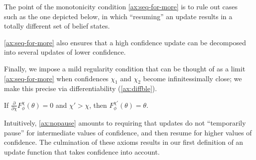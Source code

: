 The point of the monotonicity condition \cref{ax:seq-for-more} is to rule out cases such 
as the one depicted below, in which ``resuming'' an update
results in a totally different set of belief states.
\begin{center}
\end{center}
\cref{ax:seq-for-more} also ensures
that a high confidence update can be decomposed into
several updates of lower confidence. 


Finally, we impose a mild regularity condition
that can be thought of as
a limit \cref{ax:seq-for-more}
when confidences $\chi_1$ and $\chi_2$ become infinitessimally close;
we make this precise via differentiability (\cref{ax:diffble}). 

\begin{CFaxioms}
	\item \label{ax:nopause}
	If
	$\frac{\partial}{\partial\chi} F^\chi_\phi(\theta) = 0$
	and $\chi' > \chi$,
	then 
	$F^{\chi'}_\phi(\theta) = \theta$.	 
\end{CFaxioms}

Intuitively, \cref{ax:nopause} amounts to requiring that updates
do not ``temporarily pause'' for intermediate values of confidence,
and then resume for higher values of confidence.
The culmination of these axioms results in our first definition of an
update function that takes confidence into account.



